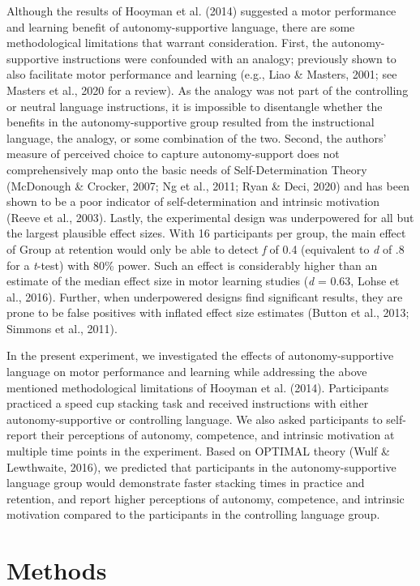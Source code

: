\documentclass[
  doc, donotrepeattitle,floatsintext]{apa7}
\begin{document}
Although the results of Hooyman et al. (2014) suggested a motor performance and learning benefit of autonomy-supportive language, there are some methodological limitations that warrant consideration. First, the autonomy-supportive instructions were confounded with an analogy; previously shown to also facilitate motor performance and learning (e.g., Liao \& Masters, 2001; see Masters et al., 2020 for a review). As the analogy was not part of the controlling or neutral language instructions, it is impossible to disentangle whether the benefits in the autonomy-supportive group resulted from the instructional language, the analogy, or some combination of the two. Second, the authors' measure of perceived choice to capture autonomy-support does not comprehensively map onto the basic needs of Self-Determination Theory (McDonough \& Crocker, 2007; Ng et al., 2011; Ryan \& Deci, 2020) and has been shown to be a poor indicator of self-determination and intrinsic motivation (Reeve et al., 2003). Lastly, the experimental design was underpowered for all but the largest plausible effect sizes. With 16 participants per group, the main effect of Group at retention would only be able to detect \emph{f} of 0.4 (equivalent to \emph{d} of .8 for a \emph{t}-test) with 80\% power. Such an effect is considerably higher than an estimate of the median effect size in motor learning studies (\emph{d} = 0.63, Lohse et al., 2016). Further, when underpowered designs find significant results, they are prone to be false positives with inflated effect size estimates (Button et al., 2013; Simmons et al., 2011).

In the present experiment, we investigated the effects of autonomy-supportive language on motor performance and learning while addressing the above mentioned methodological limitations of Hooyman et al. (2014). Participants practiced a speed cup stacking task and received instructions with either autonomy-supportive or controlling language. We also asked participants to self-report their perceptions of autonomy, competence, and intrinsic motivation at multiple time points in the experiment. Based on OPTIMAL theory (Wulf \& Lewthwaite, 2016), we predicted that participants in the autonomy-supportive language group would demonstrate faster stacking times in practice and retention, and report higher perceptions of autonomy, competence, and intrinsic motivation compared to the participants in the controlling language group.

\hypertarget{methods}{%
\section{Methods}\label{methods}}
\end{document}

